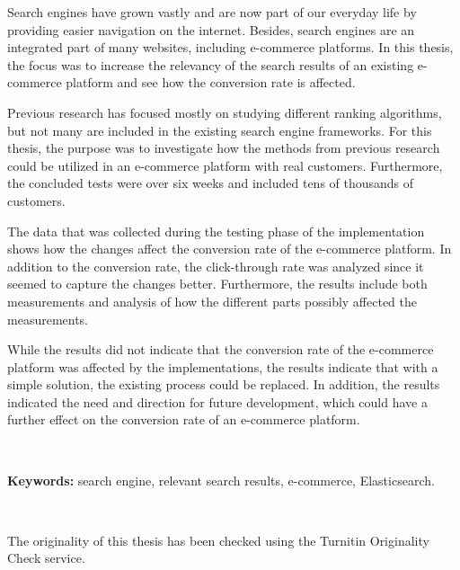 

\noindent 
Search engines have grown vastly and are now part of our everyday life 
by providing easier navigation on the internet.
Besides, search engines are an integrated part of many websites, including e-commerce 
platforms.
In this thesis, the focus was to increase the relevancy of the search results
of an existing e-commerce platform and see how the conversion rate is affected.

Previous research has focused mostly on studying different ranking algorithms, but not
many are included in the existing search engine frameworks.
For this thesis, the purpose was to investigate how the methods from previous 
research could be utilized in an e-commerce platform with real customers.
Furthermore, the concluded tests were over six weeks and included tens of thousands
of customers.

The data that was collected during the testing phase of the implementation
shows how the changes affect the conversion rate of the e-commerce platform.
In addition to the conversion rate, the click-through rate was analyzed since 
it seemed to capture the changes better.
Furthermore, the results include both measurements and analysis of how the different
parts possibly affected the measurements.

While the results did not indicate that the conversion rate of the e-commerce platform
was affected by the implementations, the results indicate that with a simple 
solution, the existing process could be replaced.
In addition, the results indicated the need and direction for future development, which could
have a further effect on the conversion rate of an e-commerce platform.


~

\noindent\textbf{Keywords:} search engine, relevant search results, e-commerce, Elasticsearch.

~

\noindent The originality of this thesis has been checked using the Turnitin Originality Check service.

\clearpage
